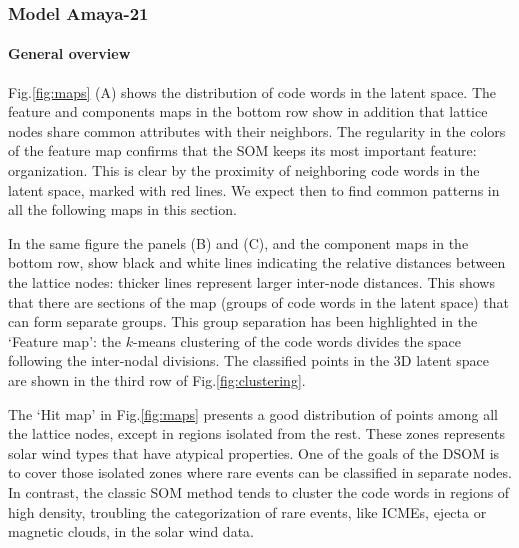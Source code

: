 \subsubsection{Model Amaya-21}

\paragraph{General overview}

Fig.\ref{fig:maps} (A) shows the distribution of code words in the latent space. The feature and components maps in the bottom row show in addition that lattice nodes share common attributes with their neighbors. The regularity in the colors of the feature map confirms that the SOM keeps its most important feature: organization. This is clear by the proximity of neighboring code words in the latent space, marked with red lines. We expect then to find common patterns in all the following maps in this section.

In the same figure the panels (B) and (C), and the component maps in the bottom row, show black and white lines indicating the relative distances between the lattice nodes: thicker lines represent larger inter-node distances. This shows that there are sections of the map (groups of code words in the latent space) that can form separate groups. This group separation has been highlighted in the `Feature map': the $k$-means clustering of the code words divides the space following the inter-nodal divisions. The classified points in the 3D latent space are shown in the third row of Fig.\ref{fig:clustering}.

The `Hit map' in Fig.\ref{fig:maps} presents a good distribution of points among all the lattice nodes, except in regions isolated from the rest. These zones represents solar wind types that have atypical properties. One of the goals of the DSOM is to cover those isolated zones where rare events can be classified in separate nodes. In contrast, the classic SOM method tends to cluster the code words in regions of high density, troubling the categorization of rare events, like ICMEs, ejecta or magnetic clouds, in the solar wind data.

